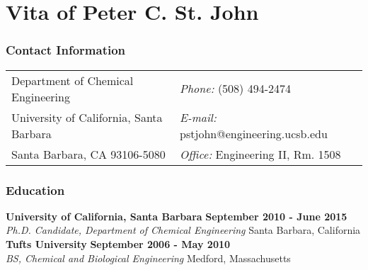 {
\singlespace
\setlength{\parindent}{0em}
\setlength{\parskip}{1em}

\chapter*{Vita of Peter C. St. John}

\subsection*{Contact Information}
\vspace{.05in}
\begin{tabular}{@{}p{3.5in}p{4in}}
Department of Chemical Engineering   & {\it Phone:}  (508) 494-2474\\             
University of California, Santa Barbara & {\it E-mail:} pstjohn@engineering.ucsb.edu\\       
Santa Barbara, CA 93106-5080 & {\it Office:} Engineering II, Rm. 1508\\
\end{tabular}


\subsection*{Education}
  {\bf University of California, Santa Barbara} \hfill {\bf September 2010 - June 2015} \\
  {\em Ph.D. Candidate, Department of Chemical Engineering} \hfill Santa Barbara,
  California \\[-3ex]

  {\bf Tufts University}  \hfill {\bf September 2006 - May 2010}\\
  {\em BS, Chemical and Biological Engineering} \hfill Medford,
  Massachusetts\\[-3ex]

}
